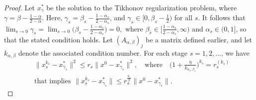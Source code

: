 \documentclass[smallextended,referee,envcountsect]{svjour3}
\begin{document}
\begin{proof}
Let $ x_{\gamma}^* $ be the solution to the Tikhonov regularization problem, where
$
\gamma = \beta - \frac{1 - \alpha}{2 - \alpha}.
$ Here, $ \gamma_s = \beta_s - \frac{1 - \alpha_s}{2 - \alpha_s} $, and $ \gamma_s \in \Big[0, \beta_s - \frac{1}{2}\Big) $ for all $ s $. It follows that
$
\lim_{s \rightarrow0} \gamma_s = \lim_{s \rightarrow0} \Big( \beta_s - \frac{1 - \alpha_s}{2 - \alpha_s} \Big) = 0,
$
where $ \beta_s \in \Big[ \frac{1 - \alpha_s}{2 - \alpha_s}, \infty \Big) $ and $ \alpha_s \in (0,1] $, so that the stated condition holds. Let $ (A_{\alpha, \beta})_j $ be a matrix defined earlier, and let $ k_{\alpha, \beta} $ denote the associated condition number. For each stage $ s = 1, 2, \dots $, we have
\vspace{-1 mm}
\begin{align*}
&\Big\| x_s^{k_s} - x^*_{\gamma_s} \Big\|^2 
\leq r_s \Big\| x^{0} - x^*_{\gamma_s} \Big\|^2, 
\quad \text{where} \quad
\Big(1 + \frac{\eta}{k_{\alpha_s,\beta_s}} \Big)^{k_s} = r_s^{(k_s)}\\
&\text{that implies}~~\Big\| x_s^{k_s} - x^*_{\gamma_s} \Big\| 
\leq r_s^{\frac{k_s}{2}} \Big\| x^{0} - x^*_{\gamma_s} \Big\|.
\end{align*}


\end{proof}
\end{document}
